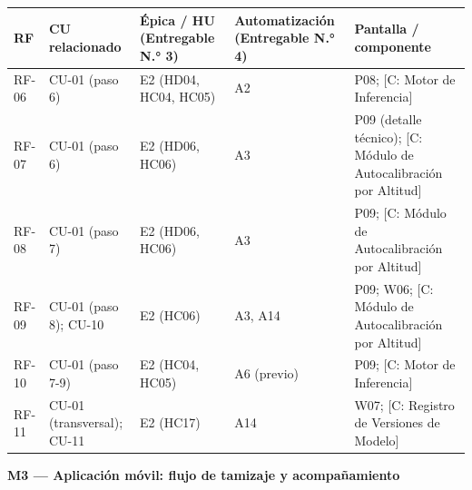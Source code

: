 \documentclass[11pt,a4paper]{article}
\begin{document}
{\small
\begin{longtable}[]{@{}
  >{\raggedright\arraybackslash}p{}
  >{\raggedright\arraybackslash}p{}
  >{\raggedright\arraybackslash}p{}
  >{\raggedright\arraybackslash}p{}
  >{\raggedright\arraybackslash}p{}@{}}
\toprule\noalign{}
\begin{minipage}[b]{\linewidth}\raggedright
RF
\end{minipage} & \begin{minipage}[b]{\linewidth}\raggedright
CU relacionado
\end{minipage} & \begin{minipage}[b]{\linewidth}\raggedright
Épica / HU (Entregable N.° 3)
\end{minipage} & \begin{minipage}[b]{\linewidth}\raggedright
Automatización (Entregable N.° 4)
\end{minipage} & \begin{minipage}[b]{\linewidth}\raggedright
Pantalla / componente
\end{minipage} \\
\midrule\noalign{}
\endhead
\bottomrule\noalign{}
\endlastfoot
RF-06 & CU-01 (paso 6) & E2 (HD04, HC04, HC05) & A2 & P08; {[}C: Motor de Inferencia{]} \\
RF-07 & CU-01 (paso 6) & E2 (HD06, HC06) & A3 & P09 (detalle técnico); {[}C: Módulo de Autocalibración por Altitud{]} \\
RF-08 & CU-01 (paso 7) & E2 (HD06, HC06) & A3 & P09; {[}C: Módulo de Autocalibración por Altitud{]} \\
RF-09 & CU-01 (paso 8); CU-10 & E2 (HC06) & A3, A14 & P09; W06; {[}C: Módulo de Autocalibración por Altitud{]} \\
RF-10 & CU-01 (paso 7-9) & E2 (HC04, HC05) & A6 (previo) & P09; {[}C: Motor de Inferencia{]} \\
RF-11 & CU-01 (transversal); CU-11 & E2 (HC17) & A14 & W07; {[}C: Registro de Versiones de Modelo{]} \\
\end{longtable}
}

\textbf{M3 --- Aplicación móvil: flujo de tamizaje y acompañamiento}
\end{document}
